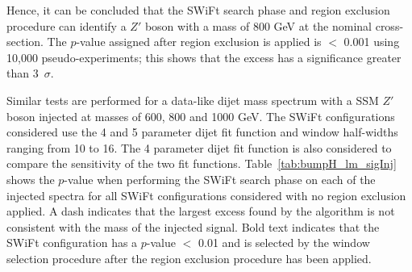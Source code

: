 Hence, it can be concluded that the SWiFt search phase and region exclusion procedure can identify
a $Z'$ boson with a mass of 800 GeV at the nominal cross-section.
The \bh{} $p$-value assigned after region exclusion is applied is $<$ 0.001 using 10,000 pseudo-experiments;
this shows that the excess has a significance greater than 3~$\sigma$.

\FloatBarrier

Similar tests are performed for a data-like dijet mass spectrum
with a SSM $Z'$ boson injected at masses of 600, 800 and 1000 GeV.
The SWiFt configurations considered use the 4 and 5 parameter dijet fit function and window half-widths ranging from 10 to 16.
The 4 parameter dijet fit function is also considered to compare the sensitivity of the two fit functions.
Table~\ref{tab:bumpH_lm_sigInj} shows the \bh{} \mbox{$p$-value} 
when performing the SWiFt search phase on each of the injected spectra
for all SWiFt configurations considered with no region exclusion applied.
A dash indicates that the largest excess found by the \bh{} algorithm is not consistent with the mass of the injected signal.
Bold text indicates that the SWiFt configuration has a \bh{} $p$-value $<$ 0.01
and is selected by the window selection procedure after the region exclusion procedure has been applied.


